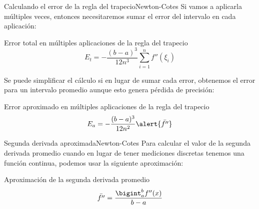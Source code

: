 \documentclass[spanish, c, dvipsnames]{beamer}
\begin{document}
\begin{frame}{Calculando el error de la regla del trapecio}{Newton-Cotes}
    Si vamos a aplicarla múltiples veces, entonces necesitaremos sumar el error del intervalo en cada aplicación:

    \begin{block}{Error total en múltiples aplicaciones de la regla del trapecio}
        \begin{equation}
            \label{eq:trapezoidal-multi-error-exact}
            E_t = - \frac{(b-a)^3}{12 n^3} \sum\limits_{i=1}^n f''(\xi_i)
        \end{equation}
    \end{block}

    Se puede simplificar el cálculo si en lugar de sumar cada error, obtenemos el error para un \alert{intervalo promedio} aunque esto genera pérdida de precisión:

    \begin{exampleblock}{Error aproximado en múltiples aplicaciones de la regla del trapecio}
        \begin{equation}
            \label{eq:trapezoidal-multi-error-approx}
            E_a = - \frac{(b - a)^3}{12n^2} \alert{\bar{f''}}
        \end{equation}
    \end{exampleblock}

\end{frame}

\begin{frame}{Segunda derivada aproximada}{Newton-Cotes}
    Para calcular el valor de la \alert{segunda derivada promedio} cuando en lugar de tener mediciones discretas tenemos una función continua, podemos usar la siguiente aproximación:

    \bigskip

    \begin{block}{Aproximación de la segunda derivada promedio}
        \begin{equation}
            \label{eq:average-second-derivative}
            \bar{f''} = \dfrac{\bigint _a^b f''(x)}{b - a}
        \end{equation}
    \end{block}
\end{frame}
\end{document}
